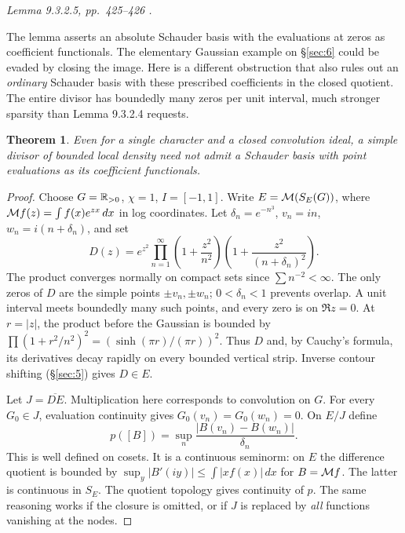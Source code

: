 \documentclass[11pt,reqno]{amsart}
\newtheorem{theorem}{Theorem}[section]
\numberwithin{equation}{section}
\begin{document}
\textit{Lemma 9.3.2.5, pp.~425--426 .}\par
The lemma asserts an absolute Schauder basis with the evaluations at zeros as coefficient functionals. The elementary Gaussian example on \S\ref{sec:6} could be evaded by closing the image. Here is a different obstruction that also rules out an \emph{ordinary} Schauder basis with these prescribed coefficients in the closed quotient. The entire divisor has boundedly many zeros per unit interval, much stronger sparsity than Lemma 9.3.2.4 requests.

\begin{theorem}Even for a single character and a closed convolution ideal, a simple divisor of bounded local density need not admit a Schauder basis with point evaluations as its coefficient functionals.\end{theorem}\begin{proof}
Choose \(G=\mathbb R_{>0}\), \(\chi=1\), \(I=[-1,1]\). Write \(E=\mathcal M(S_E(G))\), where \(\mathcal M f(z)=\int f(x)e^{zx}\,dx\) in log coordinates. Let \(\delta_n=e^{-n^3}\), \(v_n=in\), \(w_n=i(n+\delta_n)\), and set
\[
 D(z)=e^{z^2}\prod_{n=1}^\infty
 \left(1+\frac{z^2}{n^2}\right)\left(1+\frac{z^2}{(n+\delta_n)^2}\right).
\]
The product converges normally on compact sets since \(\sum n^{-2}<\infty\). The only zeros of \(D\) are the simple points \(\pm v_n,\pm w_n\); \(0<\delta_n<1\) prevents overlap. A unit interval meets boundedly many such points, and every zero is on \(\Re z=0\). At \(r=|z|\), the product before the Gaussian is bounded by \(\prod(1+r^2/n^2)^2=(\sinh(\pi r)/(\pi r))^2\). Thus \(D\) and, by Cauchy's formula, its derivatives decay rapidly on every bounded vertical strip. Inverse contour shifting (\S\ref{sec:5}) gives \(D\in E\).

Let \(J=\overline{D E}\). Multiplication here corresponds to convolution on \(G\). For every \(G_0\in J\), evaluation continuity gives \(G_0(v_n)=G_0(w_n)=0\). On \(E/J\) define
\[
        p([B])=\sup_n\frac{|B(v_n)-B(w_n)|}{\delta_n}.
\]
This is well defined on cosets. It is a continuous seminorm: on \(E\) the difference quotient is bounded by \(\sup_y|B'(iy)|\le\int |x f(x)|\,dx\) for \(B=\mathcal M f\). The latter is continuous in \(S_E\). The quotient topology gives continuity of \(p\). The same reasoning works if the closure is omitted, or if \(J\) is replaced by \emph{all} functions vanishing at the nodes.


\end{proof}
\end{document}
